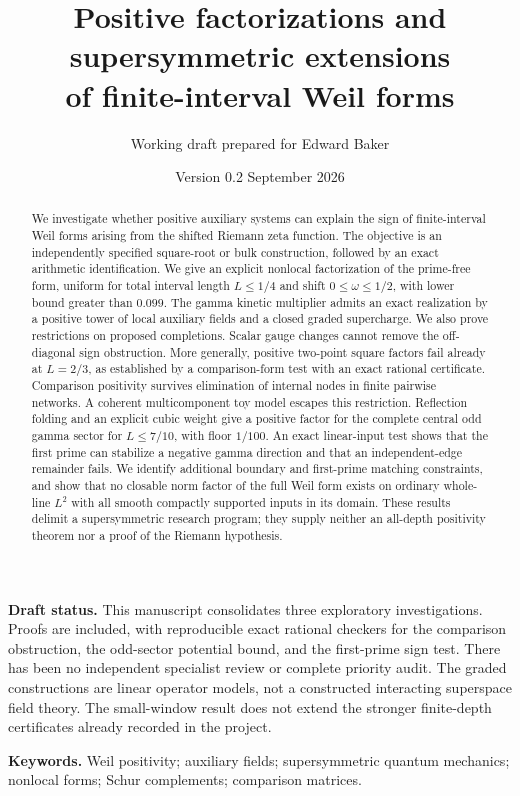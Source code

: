 \documentclass[11pt]{article}
\title{Positive factorizations and supersymmetric extensions\\of finite-interval Weil forms}
\author{Working draft prepared for Edward Baker}
\date{Version 0.2 \quad 11 September 2026}
\numberwithin{equation}{section}
\theoremstyle{definition}
\theoremstyle{remark}
\begin{document}
\maketitle
\begin{abstract}
We investigate whether positive auxiliary systems can explain the sign of
finite-interval Weil forms arising from the shifted Riemann zeta function.
The objective is an independently specified square-root or bulk construction,
followed by an exact arithmetic identification. We give an explicit nonlocal
factorization of the prime-free form, uniform for total interval length
$L\leq1/4$ and shift $0\leq\omega\leq1/2$, with lower bound greater than
$0.099$. The gamma kinetic multiplier admits an exact realization by a
positive tower of local auxiliary fields and a closed graded supercharge.
We also prove restrictions on proposed completions. Scalar gauge changes
cannot remove the off-diagonal sign obstruction. More generally, positive
two-point square factors fail already at $L=2/3$, as established by a
comparison-form test with an exact rational certificate. Comparison
positivity survives elimination of internal nodes in finite pairwise
networks. A coherent multicomponent toy model escapes this restriction. Reflection
folding and an explicit cubic weight give a positive factor for the complete
central odd gamma sector for $L\leq7/10$, with floor $1/100$. An exact
linear-input test shows that the first prime can stabilize a negative gamma
direction and that an independent-edge remainder fails.
We identify additional boundary and first-prime matching constraints, and
show that no closable norm factor of the full Weil form exists on ordinary
whole-line $L^2$ with all smooth compactly supported inputs in its domain.
These results delimit a supersymmetric research program; they supply neither
an all-depth positivity theorem nor a proof of the Riemann hypothesis.
\end{abstract}

\noindent\textbf{Draft status.}
This manuscript consolidates three exploratory investigations. Proofs are
included, with reproducible exact rational checkers for the comparison
obstruction, the odd-sector potential bound, and the first-prime sign test.
There has been no independent specialist review or complete priority audit.
The graded constructions are linear operator models, not a constructed
interacting superspace field theory. The small-window result does not extend
the stronger finite-depth certificates already recorded in the project.

\smallskip
\noindent\textbf{Keywords.} Weil positivity; auxiliary fields; supersymmetric
quantum mechanics; nonlocal forms; Schur complements; comparison matrices.
\end{document}
